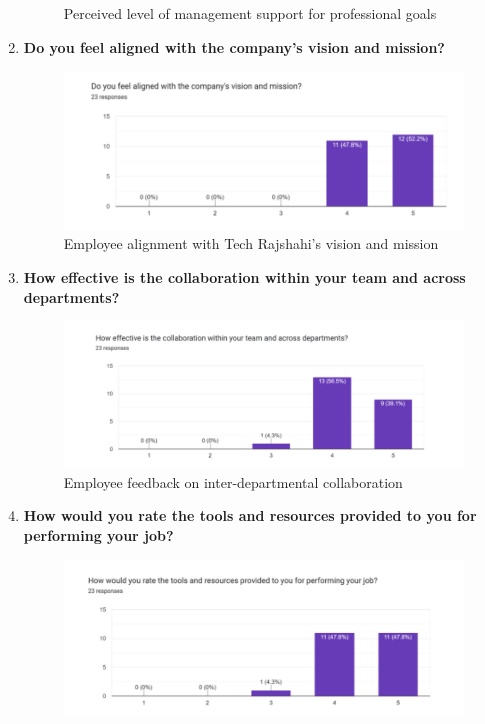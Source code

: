 \documentclass[12pt,a4paper]{article}
\begin{document}
\begin{enumerate}
\begin{figure}[H]
        \caption{Perceived level of management support for professional goals}
        \label{fig:management_support}
    \end{figure}
  \vspace{1cm}
    \item \textbf{Do you feel aligned with the company’s vision and mission?}  
    \begin{figure}[H]
        \centering
        \includegraphics[width=\textwidth]{Fig/vm.png}
        \caption{Employee alignment with Tech Rajshahi’s vision and mission}
        \label{fig:vision_mission}
    \end{figure}
\newpage
    \item \textbf{How effective is the collaboration within your team and across departments?}  
    \begin{figure}[H]
        \centering
        \includegraphics[width=\textwidth]{Fig/colab.png}
        \caption{Employee feedback on inter-departmental collaboration}
        \label{fig:collaboration}
    \end{figure}
  \vspace{1cm}
    \item \textbf{How would you rate the tools and resources provided to you for performing your job?}  
    \begin{figure}[H]
        \centering
        \includegraphics[width=\textwidth]{Fig/pj.png}

\end{figure}
\end{enumerate}
\end{document}
